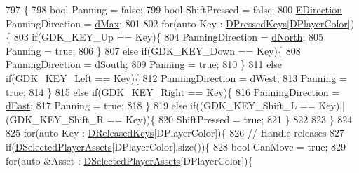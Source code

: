 \begin{DoxyCode}
797                                            \{
798     \textcolor{keywordtype}{bool} Panning = \textcolor{keyword}{false};
799     \textcolor{keywordtype}{bool} ShiftPressed = \textcolor{keyword}{false};
800     \hyperlink{GameDataTypes_8h_acb2b033915f6659a71a38b5aa6e4eb42}{EDirection} PanningDirection = \hyperlink{GameDataTypes_8h_acb2b033915f6659a71a38b5aa6e4eb42af6546049275557ce0ade2ceee042a319}{dMax};
801     
802     \textcolor{keywordflow}{for}(\textcolor{keyword}{auto} Key : \hyperlink{classCApplicationData_ac6f50c764f7561c0bd2a9fbce55b2701}{DPressedKeys}[\hyperlink{classCApplicationData_a53550939b20cba70570f113e4d1c5d02}{DPlayerColor}])\{
803         \textcolor{keywordflow}{if}(GDK\_KEY\_Up == Key)\{
804             PanningDirection = \hyperlink{GameDataTypes_8h_acb2b033915f6659a71a38b5aa6e4eb42a74d0139aee571cee88ff1393bbc6999e}{dNorth};
805             Panning = \textcolor{keyword}{true};
806         \}
807         \textcolor{keywordflow}{else} \textcolor{keywordflow}{if}(GDK\_KEY\_Down == Key)\{
808             PanningDirection = \hyperlink{GameDataTypes_8h_acb2b033915f6659a71a38b5aa6e4eb42ab97d9c3d0f527d3f74de60cc1889ecd0}{dSouth};
809             Panning = \textcolor{keyword}{true};
810         \}
811         \textcolor{keywordflow}{else} \textcolor{keywordflow}{if}(GDK\_KEY\_Left == Key)\{
812             PanningDirection = \hyperlink{GameDataTypes_8h_acb2b033915f6659a71a38b5aa6e4eb42a3006340383b02f53e16c07e89b1163b0}{dWest};
813             Panning = \textcolor{keyword}{true};
814         \}
815         \textcolor{keywordflow}{else} \textcolor{keywordflow}{if}(GDK\_KEY\_Right == Key)\{
816             PanningDirection = \hyperlink{GameDataTypes_8h_acb2b033915f6659a71a38b5aa6e4eb42a06b098879996cb811972f1fb43f11e55}{dEast};
817             Panning = \textcolor{keyword}{true};
818         \}
819         \textcolor{keywordflow}{else} \textcolor{keywordflow}{if}((GDK\_KEY\_Shift\_L == Key)||(GDK\_KEY\_Shift\_R == Key))\{
820             ShiftPressed = \textcolor{keyword}{true};   
821         \}
822         
823     \}
824     
825     \textcolor{keywordflow}{for}(\textcolor{keyword}{auto} Key : \hyperlink{classCApplicationData_adcef59167cadd8ee516884a7c0df08f6}{DReleasedKeys}[DPlayerColor])\{
826         \textcolor{comment}{// Handle releases}
827         \textcolor{keywordflow}{if}(\hyperlink{classCApplicationData_a05c1087d5a5c4ddc14fcb37444f1642b}{DSelectedPlayerAssets}[DPlayerColor].size())\{
828             \textcolor{keywordtype}{bool} CanMove = \textcolor{keyword}{true};
829             \textcolor{keywordflow}{for}(\textcolor{keyword}{auto} &Asset : \hyperlink{classCApplicationData_a05c1087d5a5c4ddc14fcb37444f1642b}{DSelectedPlayerAssets}[DPlayerColor])\{

\end{DoxyCode}
